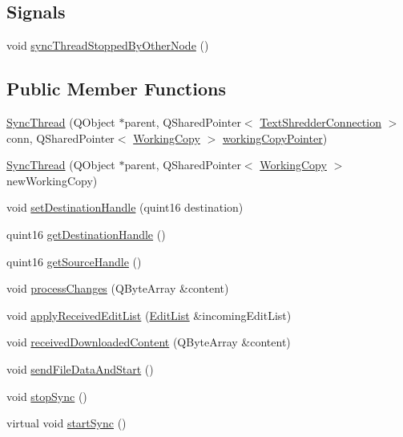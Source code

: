 \subsection*{Signals}
\begin{DoxyCompactItemize}
\item 
void \hyperlink{class_sync_thread_a3fdb7012eaab57fa279053e053089571}{syncThreadStoppedByOtherNode} ()
\end{DoxyCompactItemize}
\subsection*{Public Member Functions}
\begin{DoxyCompactItemize}
\item 
\hyperlink{class_sync_thread_a838e6607043e507e4f06b3ee0e931d60}{SyncThread} (QObject $\ast$parent, QSharedPointer$<$ \hyperlink{class_text_shredder_connection}{TextShredderConnection} $>$conn, QSharedPointer$<$ \hyperlink{class_working_copy}{WorkingCopy} $>$ \hyperlink{class_sync_thread_a73bbe84d7d531f2e6e728d5ade881270}{workingCopyPointer})
\item 
\hyperlink{class_sync_thread_af9f68f9446253b0422c5f3f6b60fc1bb}{SyncThread} (QObject $\ast$parent, QSharedPointer$<$ \hyperlink{class_working_copy}{WorkingCopy} $>$ newWorkingCopy)
\item 
void \hyperlink{class_sync_thread_af7f1764ea4b24f2c1cc2dbfc2eb5c8e7}{setDestinationHandle} (quint16 destination)
\item 
quint16 \hyperlink{class_sync_thread_a4572c02a85d3a71d4a43e0e8eb6cb3f7}{getDestinationHandle} ()
\item 
quint16 \hyperlink{class_sync_thread_a0e61dc4f301a5c8b415604e372e5e0f5}{getSourceHandle} ()
\item 
void \hyperlink{class_sync_thread_a5d627a46f2748963951890020902c81e}{processChanges} (QByteArray \&content)
\item 
void \hyperlink{class_sync_thread_a15b6e123fe1c76643597836618256619}{applyReceivedEditList} (\hyperlink{class_edit_list}{EditList} \&incomingEditList)
\item 
void \hyperlink{class_sync_thread_a07ecfc517a9536a5b4b3f71f91d7e940}{receivedDownloadedContent} (QByteArray \&content)
\item 
void \hyperlink{class_sync_thread_a50f1506b24f64af4cc99db115298c2b2}{sendFileDataAndStart} ()
\item 
void \hyperlink{class_sync_thread_a6479eed6d3f611deb5986030427f91eb}{stopSync} ()
\item 
virtual void \hyperlink{class_sync_thread_a698ef3633b24d3529a6c17e5e3a99170}{startSync} ()
\end{DoxyCompactItemize}
